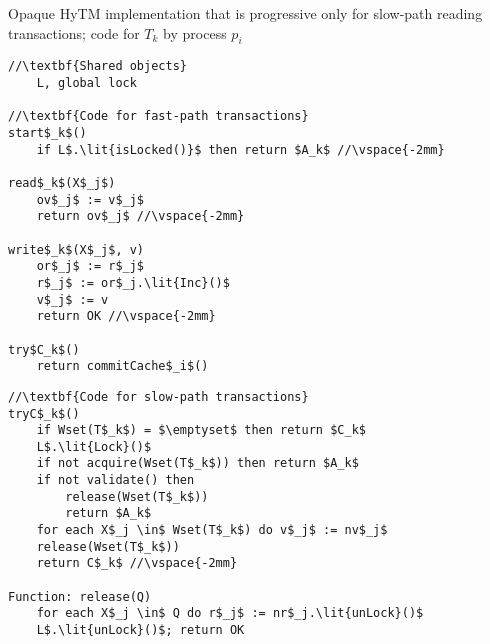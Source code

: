 \begin{algorithm*}[!t]
\caption{Opaque HyTM implementation that is progressive only for slow-path reading transactions; code for $T_k$ by process $p_i$}
\label{alg:inswrite2}
\vspace{-2mm}
\noindent\lstset{style=customc}
\begin{minipage}{0.49\textwidth}
\begin{lstlisting}[frame=none,firstnumber=1,mathescape=true]
//\textbf{Shared objects}
    L, global lock

//\textbf{Code for fast-path transactions}
start$_k$()
    if L$.\lit{isLocked()}$ then return $A_k$ //\vspace{-2mm}

read$_k$(X$_j$)
    ov$_j$ := v$_j$ 
    return ov$_j$ //\vspace{-2mm}

write$_k$(X$_j$, v)
    or$_j$ := r$_j$ 
    r$_j$ := or$_j.\lit{Inc}()$ 
    v$_j$ := v 
    return OK //\vspace{-2mm}

try$C_k$()
    return commitCache$_i$() 
\end{lstlisting}
\end{minipage}
\begin{minipage}{0.49\textwidth}
\begin{lstlisting}[frame=none,firstnumber=last,mathescape=true]
//\textbf{Code for slow-path transactions}
tryC$_k$()
    if Wset(T$_k$) = $\emptyset$ then return $C_k$
    L$.\lit{Lock}()$
    if not acquire(Wset(T$_k$)) then return $A_k$
    if not validate() then
        release(Wset(T$_k$))
        return $A_k$
    for each X$_j \in$ Wset(T$_k$) do v$_j$ := nv$_j$
    release(Wset(T$_k$))
    return C$_k$ //\vspace{-2mm}
    
Function: release(Q)
    for each X$_j \in$ Q do r$_j$ := nr$_j.\lit{unLock}()$
    L$.\lit{unLock}()$; return OK
\end{lstlisting}
\end{minipage}
\vspace{-2mm}
\end{algorithm*}
